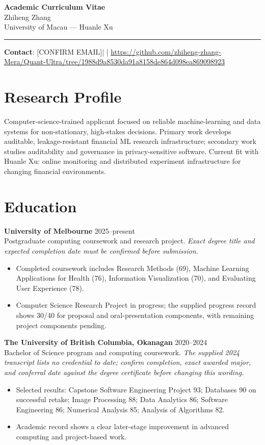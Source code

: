 \documentclass[11pt]{article}
\newcommand{\ApplicantName}{Zhiheng Zhang}
\newcommand{\ApplicantEmail}{[CONFIRM EMAIL]}
\newcommand{\ApplicantPhone}{[CONFIRM PHONE]}
\newcommand{\ApplicantGitHub}{\url{https://github.com/zhiheng-zhang-Mera/Quant-Ultra/tree/1988d9a8530da91a8158de864d098ea869098923}}
\begin{document}
\begin{center}
{\LARGE\bfseries Academic Curriculum Vitae}\\[0.25em]
{\large \ApplicantName}\\
University of Macau --- Huanle Xu
\end{center}
\vspace{0.35em}\hrule\vspace{0.65em}

\textbf{Contact}: \ApplicantEmail\quad | \quad \ApplicantPhone\quad | \quad \ApplicantGitHub

\section*{Research Profile}
Computer-science-trained applicant focused on reliable machine-learning and data systems for non-stationary, high-stakes decisions. Primary work develops auditable, leakage-resistant financial ML research infrastructure; secondary work studies auditability and governance in privacy-sensitive software. Current fit with Huanle Xu: online monitoring and distributed experiment infrastructure for changing financial environments.

\section*{Education}
\textbf{University of Melbourne} \hfill 2025--present\\
Postgraduate computing coursework and research project. \textit{Exact degree title and expected completion date must be confirmed before submission.}
\begin{itemize}
\item Completed coursework includes Research Methods (69), Machine Learning Applications for Health (76), Information Visualization (70), and Evaluating User Experience (78).
\item Computer Science Research Project in progress; the supplied progress record shows 30/40 for proposal and oral-presentation components, with remaining project components pending.
\end{itemize}

\textbf{The University of British Columbia, Okanagan} \hfill 2020--2024\\
Bachelor of Science program and computing coursework. \textit{The supplied 2024 transcript lists no credential to date; confirm completion, exact awarded major, and conferral date against the degree certificate before changing this wording.}
\begin{itemize}
\item Selected results: Capstone Software Engineering Project 93; Databases 90 on successful retake; Image Processing 88; Data Analytics 86; Software Engineering 86; Numerical Analysis 85; Analysis of Algorithms 82.
\item Academic record shows a clear later-stage improvement in advanced computing and project-based work.
\end{itemize}
\end{document}
